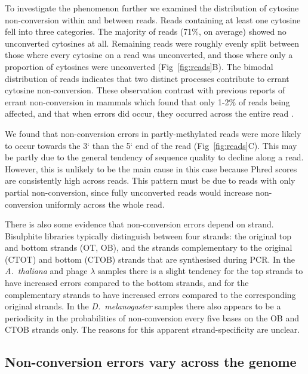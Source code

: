 \documentclass[10pt,letterpaper]{article}
\begin{document}
To investigate the phenomenon further we examined the distribution of cytosine non-conversion within and between reads.
Reads containing at least one cytosine fell into three categories.
The majority of reads (71\%, on average) showed no unconverted cytosines at all.
Remaining reads were roughly evenly split between those where every cytosine on a read was unconverted, and those where only a proportion of cytosines were unconverted (Fig~\ref{fig:reads}B).
The bimodal distribution of reads indicates that two distinct processes contribute to errant cytosine non-conversion.
These observation contrast with previous reports of errant non-conversion in mammals which found that only 1-2\% of reads being affected, and that when errors did occur, they occurred across the entire read \cite{lu2015improved, suzuki2018whole}.

We found that non-conversion errors in partly-methylated reads were more likely to occur towards the 3` than the 5` end of the read (Fig~\ref{fig:reads}C).
This may be partly due to the general tendency of sequence quality to decline along a read.
However, this is unlikely to be the main cause in this case because Phred scores are consistently high across reads.
This pattern must be due to reads with only partial non-conversion, since fully unconverted reads would increase non-conversion uniformly across the whole read.

There is also some evidence that non-conversion errors depend on strand.
Bisulphite libraries typically distinguish between four strands: the original top and bottom strands (OT, OB), and the strands complementary to the original (CTOT) and bottom (CTOB) strands that are synthesised during PCR.
In the \emph{A.~thaliana} and phage $\lambda$ samples there is a slight tendency for the top strands to have increased errors compared to the bottom strands, and for the complementary strands to have increased errors compared to the corresponding original strands.
In the \emph{D.~melanogaster} samples there also appears to be a periodicity in the probabilities of non-conversion every five bases on the OB and CTOB strands only.
The reasons for this apparent strand-specificity are unclear.

\subsection*{Non-conversion errors vary across the genome}
\end{document}
